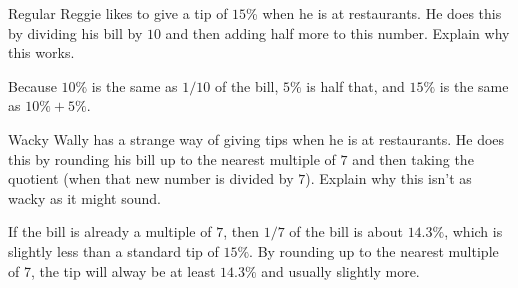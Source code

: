 \documentclass[nooutcomes]{ximera}
\begin{document}
\begin{problem}Regular Reggie likes to give a tip of $15$\% when he is at
  restaurants. He does this by dividing his bill by $10$ and then
  adding half more to this number. Explain why this works.
\begin{freeResponse}
\begin{hint}
Because $10\%$ is the same as $1/10$ of the bill, $5\%$ is half that, and $15\%$ is the same as $10\% + 5\%$.  
\end{hint}
\end{freeResponse}
\end{problem} 

\begin{problem}Wacky Wally has a strange way of giving tips when he is at
  restaurants. He does this by rounding his bill up to the nearest
  multiple of $7$ and then taking the quotient (when that new number
  is divided by $7$). Explain why this isn't as wacky as it might
  sound.
\begin{freeResponse}
\begin{hint}
If the bill is already a multiple of $7$, then $1/7$ of the bill is about $14.3\%$, which is slightly less than a standard tip of $15\%$.  By rounding up to the nearest multiple of 7, the tip will alway be at least $14.3\%$ and usually slightly more.  
\end{hint}
\end{freeResponse}
\end{problem} 


%
\end{document}
